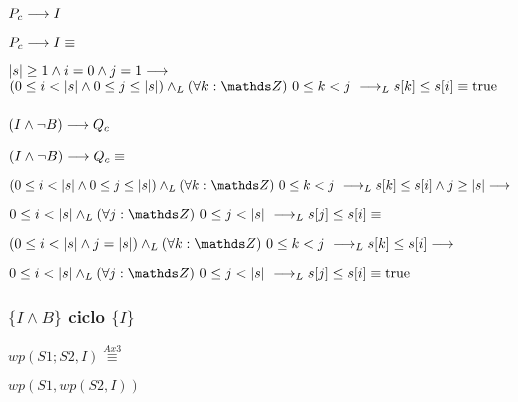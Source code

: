 \documentclass{article}
\begin{document}
\subsubsection*{$P_{c} \longrightarrow I$}

$P_{c} \longrightarrow I \equiv$

$|s| \geq 1 \wedge i = 0 \wedge j = 1 \longrightarrow$
$(0 \leq i < \longitud{s} \wedge 0 \leq j \leq \longitud{s}) \yLuego \paraTodo{k}{0}{j} \implicaLuego s[k] \leq s[i] \equiv \True$

\subsubsection*{$(I \wedge \neg B) \longrightarrow Q_{c}$}

$(I \wedge \neg B) \longrightarrow Q_{c} \equiv$

$(0 \leq i < \longitud{s} \wedge 0 \leq j \leq \longitud{s}) \yLuego \paraTodo{k}{0}{j} \implicaLuego s[k] \leq s[i] \wedge j \geq \longitud{s} \implica$

$0 \leq i < \longitud{s} \yLuego \paraTodo{j}{0}{\longitud{s}} \implicaLuego s[j] \leq s[i] \equiv$

$(0 \leq i < \longitud{s} \wedge j = \longitud{s}) \yLuego \paraTodo{k}{0}{j} \implicaLuego s[k] \leq s[i] \implica$

$0 \leq i < \longitud{s} \yLuego \paraTodo{j}{0}{\longitud{s}} \implicaLuego s[j] \leq s[i] \equiv \True$

\subsubsection*{$\{I \wedge B\}$ ciclo $\{ I \}$}

$wp(S1;S2, I) \stackrel{Ax3}{\equiv}$

$wp(S1, wp(S2, I))$
\end{document}
